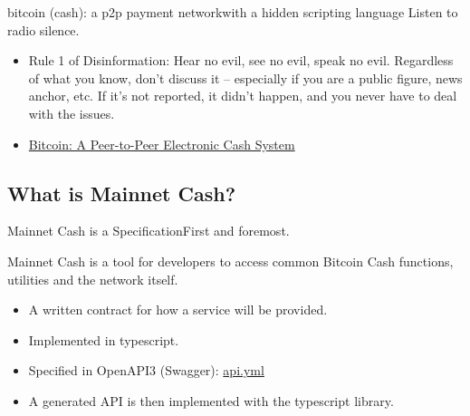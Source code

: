 \documentclass{beamer}
\begin{document}
\begin{frame}{bitcoin (cash): a p2p payment network}{with a hidden scripting language}
  Listen to radio silence.
  \begin{itemize}
    \item
    Rule 1 of Disinformation: Hear no evil, see no evil, speak no evil. Regardless of what you know, don't discuss it -- especially if you are a public figure, news anchor, etc. If it's not reported, it didn't happen, and you never have to deal with the issues.
\item
\href{https://awesomebitcoin.cash/\#whitepaper}{Bitcoin: A Peer-to-Peer Electronic Cash System}
  \end{itemize}
 
\end{frame}




\subsection[Mainnet Cash]{What is Mainnet Cash?}

\begin{frame}{Mainnet Cash is a Specification}{First and foremost.}

  Mainnet Cash is a tool for developers to access common Bitcoin Cash functions, utilities and the network itself.
  \begin{itemize}
  \item
    A written contract for how a service will be provided.
  \item
    Implemented in typescript.
  \item
    Specified in OpenAPI3 (Swagger): \href{https://rest-unstable.mainnet.cash/api-docs/}{api.yml}
    \item
    A generated API is then implemented with the typescript library.
    
  \end{itemize}
\end{frame}
\end{document}

